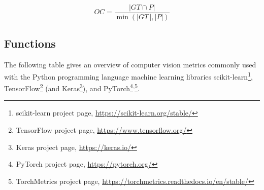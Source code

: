 \documentclass{article}
\begin{document}
\begin{equation}
	\textit{OC} = \dfrac{|\textit{GT} \cap P|}{\min(|\textit{GT}\,|, |P|)}
%
	\label{equation:OC}
\end{equation}




\clearpage




\subsection{Functions}

The following table gives an overview of computer vision metrics commonly used with the Python programming language machine learning libraries scikit-learn\footnote{scikit-learn project page, \url{https://scikit-learn.org/stable/}}, TensorFlow\footnote{TensorFlow project page, \url{https://www.tensorflow.org/}} (and Keras\footnote{Keras project page, \url{https://keras.io/}}), and PyTorch\footnote{PyTorch project page, \url{https://pytorch.org/}}\textsuperscript{,}\footnote{TorchMetrics project page, \url{https://torchmetrics.readthedocs.io/en/stable/}}.
\end{document}
